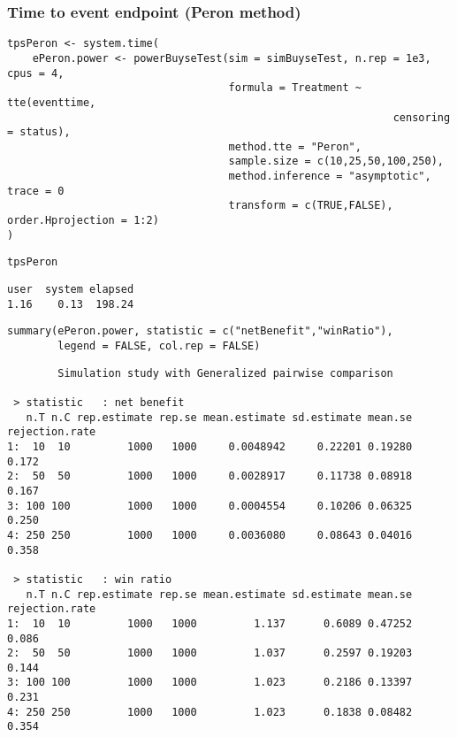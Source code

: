 \documentclass[12pt]{article}
\begin{document}
\clearpage

\subsubsection{Time to event endpoint (Peron method)}
\label{sec:org845e18a}
\lstset{language=r,label= ,caption= ,captionpos=b,numbers=none}
\begin{lstlisting}
tpsPeron <- system.time(
	ePeron.power <- powerBuyseTest(sim = simBuyseTest, n.rep = 1e3, cpus = 4,
								   formula = Treatment ~ tte(eventtime, 
															 censoring = status), 
								   method.tte = "Peron",
								   sample.size = c(10,25,50,100,250), 
								   method.inference = "asymptotic", trace = 0
								   transform = c(TRUE,FALSE), order.Hprojection = 1:2)
)
\end{lstlisting}

\lstset{language=r,label= ,caption= ,captionpos=b,numbers=none}
\begin{lstlisting}
tpsPeron
\end{lstlisting}

\begin{verbatim}
user  system elapsed 
1.16    0.13  198.24
\end{verbatim}

\lstset{language=r,label= ,caption= ,captionpos=b,numbers=none}
\begin{lstlisting}
summary(ePeron.power, statistic = c("netBenefit","winRatio"), 
		legend = FALSE, col.rep = FALSE)
\end{lstlisting}

\begin{verbatim}
        Simulation study with Generalized pairwise comparison

 > statistic   : net benefit
   n.T n.C rep.estimate rep.se mean.estimate sd.estimate mean.se rejection.rate
1:  10  10         1000   1000     0.0048942     0.22201 0.19280          0.172
2:  50  50         1000   1000     0.0028917     0.11738 0.08918          0.167
3: 100 100         1000   1000     0.0004554     0.10206 0.06325          0.250
4: 250 250         1000   1000     0.0036080     0.08643 0.04016          0.358

 > statistic   : win ratio
   n.T n.C rep.estimate rep.se mean.estimate sd.estimate mean.se rejection.rate
1:  10  10         1000   1000         1.137      0.6089 0.47252          0.086
2:  50  50         1000   1000         1.037      0.2597 0.19203          0.144
3: 100 100         1000   1000         1.023      0.2186 0.13397          0.231
4: 250 250         1000   1000         1.023      0.1838 0.08482          0.354
\end{verbatim}
\end{document}

